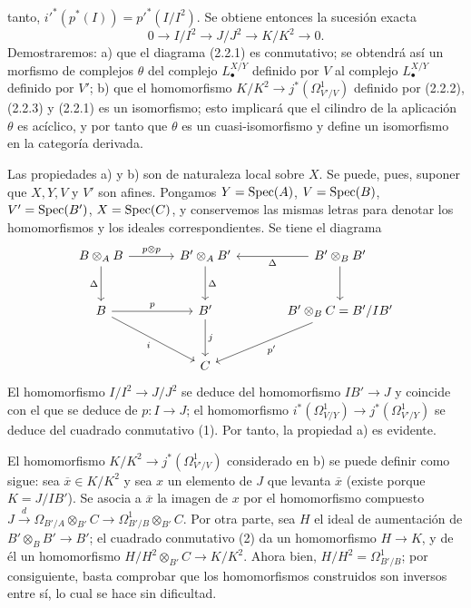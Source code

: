 tanto, $i'^*(p^*(I))=p'^*(I/I^2)$. Se obtiene entonces la sucesión exacta
\begin{equation}\tag{2.2.3}
0\longrightarrow I/I^2\longrightarrow J/J^2\longrightarrow K/K^2\longrightarrow0.
\end{equation}
Demostraremos: a) que el diagrama (2.2.1) es conmutativo; se obtendrá así un
morfismo de complejos $\theta$ del complejo $L^{X/Y}_\bullet$ definido por $V$
al complejo $L^{X/Y}_\bullet$ definido por $V'$; b) que el homomorfismo
$K/K^2\longrightarrow j^*(\Omega^1_{V'/V})$ definido por (2.2.2), (2.2.3) y
(2.2.1) es un isomorfismo; esto implicará que el cilindro de la aplicación
$\theta$ es acíclico, y por tanto que $\theta$ es un cuasi-isomorfismo y define
un isomorfismo en la categoría derivada.

Las propiedades a) y b) son de naturaleza local sobre $X$. Se puede, pues,
suponer que $X,Y,V$ y $V'$ son afines. Pongamos $Y=\operatorname{Spec}(A)$, $V=\operatorname{Spec}(B)$,
$V'=\operatorname{Spec}(B')$, $X=\operatorname{Spec}(C)$, y conservemos las mismas letras para denotar los
homomorfismos y los ideales correspondientes. Se tiene el diagrama
\[
\begin{tikzcd}[column sep=large,row sep=large]
B\otimes_A B \arrow[r,"p\otimes p"] \arrow[d,"\Delta"'] & B'\otimes_A B' \arrow[d,"\Delta"] & B'\otimes_B B' \arrow[l,"\Delta"] \arrow[d]\\
B \arrow[r,"p"] \arrow[dr,"i"'] & B' \arrow[d,"j"] & B'\otimes_B C = B'/IB' \arrow[dl,"p'" ]\\
{} & C & {}
\end{tikzcd}
\]
El homomorfismo $I/I^2\to J/J^2$ se deduce del homomorfismo $IB'\to J$ y
coincide con el que se deduce de $p:I\to J$; el homomorfismo
$i^*(\Omega^1_{V/Y})\longrightarrow j^*(\Omega^1_{V'/Y})$ se deduce del
cuadrado conmutativo (1). Por tanto, la propiedad a) es evidente.

El homomorfismo $K/K^2\to j^*(\Omega^1_{V'/V})$ considerado en b) se puede
definir como sigue: sea $\overline x\in K/K^2$ y sea $x$ un elemento de $J$ que
levanta $\overline x$ (existe porque $K=J/IB'$). Se asocia a $\overline x$ la
imagen de $x$ por el homomorfismo compuesto
$J\xrightarrow{d}\Omega_{B'/A}\otimes_{B'}C\longrightarrow\Omega^1_{B'/B}\otimes_{B'}C$.
Por otra parte, sea $H$ el ideal de aumentación
de $B'\otimes_B B'\longrightarrow B'$; el cuadrado conmutativo (2) da un
homomorfismo $H\to K$, y de él un homomorfismo
$H/H^2\otimes_{B'}C\longrightarrow K/K^2$. Ahora bien,
$H/H^2=\Omega^1_{B'/B}$; por consiguiente, basta comprobar que los
homomorfismos construidos son inversos entre sí, lo cual se hace sin dificultad.

